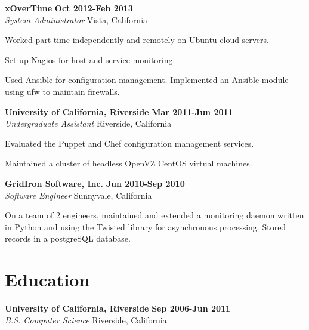 \begin{lonelist}
\item[] \textbf{xOverTime} \hfill \textbf{Oct 2012-Feb 2013}\\
  \textit{System Administrator} \hfill Vista, California
  \begin{innerlist}
  \item Worked part-time independently and remotely on Ubuntu cloud servers.

  \item Set up Nagios for host and service monitoring.

  \item Used Ansible for configuration management. Implemented an Ansible
      module using ufw to maintain firewalls.
  \end{innerlist}

\item[] \textbf{University of California, Riverside} \hfill \textbf{Mar 2011-Jun 2011}\\
  \textit{Undergraduate Assistant} \hfill Riverside, California
  \begin{innerlist}
  \item Evaluated the Puppet and Chef configuration management services.

  \item Maintained a cluster of headless OpenVZ CentOS virtual machines.
  \end{innerlist}

\item[] \textbf{GridIron Software, Inc.} \hfill \textbf{Jun 2010-Sep 2010}\\
  \textit{Software Engineer} \hfill Sunnyvale, California
  \begin{innerlist}
  \item On a team of 2 engineers, maintained and extended a monitoring daemon
      written in Python and using the Twisted library for asynchronous
      processing. Stored records in a postgreSQL database.
  \end{innerlist}

\end{lonelist}


\section{Education}
\textbf{University of California, Riverside} \hfill \textbf{Sep 2006-Jun 2011}\\
  \textit{B.S. Computer Science} \hfill Riverside, California
